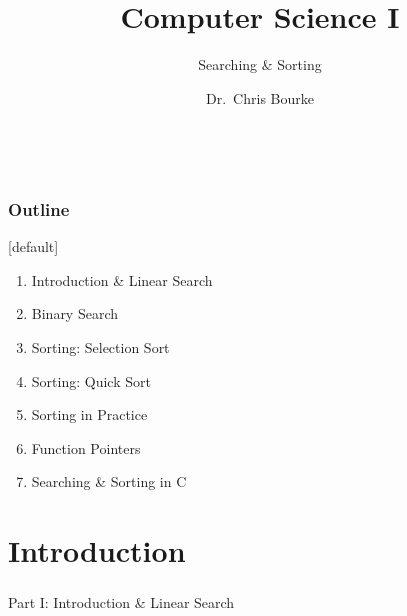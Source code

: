\documentclass[]{beamer}
\title[~]{Computer Science I}
\subtitle{Searching \& Sorting}
\author[~]{Dr.\ Chris Bourke\\ \email{cbourke@cse.unl.edu}} %
\date{~}
\begin{document}
\begin{frame}
  \titlepage
\end{frame}


\begin{frame}
  \frametitle{Outline}

[default]
\begin{enumerate}
  \item Introduction \& Linear Search
  \item Binary Search 
  \item Sorting: Selection Sort
  \item Sorting: Quick Sort
  \item Sorting in Practice
  \item Function Pointers
  \item Searching \& Sorting in C
\end{enumerate}

\end{frame}

\section{Introduction}

\begin{frame}
    \frametitle{}
    \framesubtitle{}
    
    \begin{center}
    {\Huge Part I: Introduction \& Linear Search}\\
    {\Large ~}
    \end{center}

\end{frame}
\end{document}
